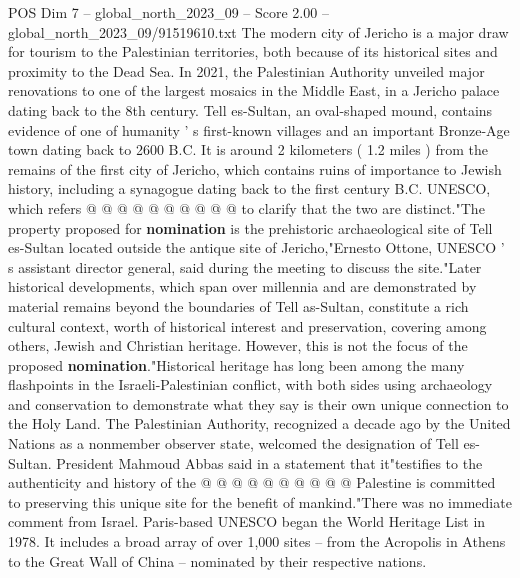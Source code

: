 \begin{textsample}{POS Dim 7 – global\_north\_2023\_09 – Score 2.00 – global\_north\_2023\_09/91519610.txt}
The modern city of Jericho is a major draw for tourism to the Palestinian territories, both because of its historical sites and proximity to the Dead Sea.
In 2021, the Palestinian Authority unveiled major renovations to one of the largest mosaics in the Middle East, in a Jericho palace dating back to the 8th century.
Tell es-Sultan, an oval-shaped mound, contains evidence of one of humanity ' s first-known villages and an important Bronze-Age town dating back to 2600 B.C.
It is around 2 kilometers ( 1.2 miles ) from the remains of the first city of Jericho, which contains ruins of importance to Jewish history, including a synagogue dating back to the first century B.C.
UNESCO, which refers @ @ @ @ @ @ @ @ @ @ to clarify that the two are distinct."The property proposed for \textbf{nomination} is the prehistoric archaeological site of Tell es-Sultan located outside the antique site of Jericho,"Ernesto Ottone, UNESCO ' s assistant director general, said during the meeting to discuss the site."Later historical developments, which span over millennia and are demonstrated by material remains beyond the boundaries of Tell as-Sultan, constitute a rich cultural context, worth of historical interest and preservation, covering among others, Jewish and Christian heritage.
However, this is not the focus of the proposed \textbf{nomination}."Historical heritage has long been among the many flashpoints in the Israeli-Palestinian conflict, with both sides using archaeology and conservation to demonstrate what they say is their own unique connection to the Holy Land.
The Palestinian Authority, recognized a decade ago by the United Nations as a nonmember observer state, welcomed the designation of Tell es-Sultan.
President Mahmoud Abbas said in a statement that it"testifies to the authenticity and history of the @ @ @ @ @ @ @ @ @ @ Palestine is committed to preserving this unique site for the benefit of mankind."There was no immediate comment from Israel.
Paris-based UNESCO began the World Heritage List in 1978.
It includes a broad array of over 1,000 sites -- from the Acropolis in Athens to the Great Wall of China -- nominated by their respective nations.

\end{textsample}
